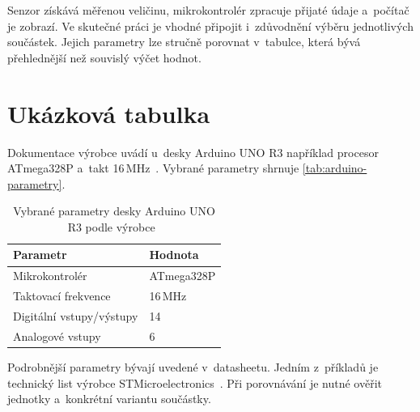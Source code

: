Senzor získává měřenou veličinu, mikrokontrolér zpracuje přijaté údaje
a~počítač je zobrazí. Ve skutečné práci je vhodné připojit i~zdůvodnění
výběru jednotlivých součástek. Jejich parametry lze stručně porovnat
v~tabulce, která bývá přehlednější než souvislý výčet hodnot.

\section{Ukázková tabulka}

Dokumentace výrobce uvádí u~desky Arduino UNO R3 například procesor
ATmega328P a~takt 16\,MHz~\cite{arduinoUNO}.
Vybrané parametry shrnuje \autoref{tab:arduino-parametry}.

\begin{table}[htbp]
  \centering
  \caption{Vybrané parametry desky Arduino UNO R3 podle výrobce~\cite{arduinoUNO}}
  \label{tab:arduino-parametry}
  \begin{tabular}{ll}
    \hline
    Parametr & Hodnota \\
    \hline
    Mikrokontrolér & ATmega328P \\
    Taktovací frekvence & 16\,MHz \\
    Digitální vstupy/výstupy & 14 \\
    Analogové vstupy & 6 \\
    \hline
  \end{tabular}
\end{table}

Podrobnější parametry bývají uvedené v~datasheetu.
Jedním z~příkladů je technický list výrobce
STMicroelectronics~\cite{stm32datasheet}. Při porovnávání je nutné
ověřit jednotky a~konkrétní variantu součástky.

